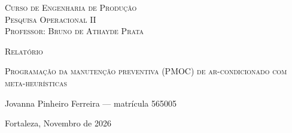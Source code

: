 \thispagestyle{empty}
\begin{titlingpage}



\begin{center}\large
    \textsc{Curso de Engenharia de Produção}\\
    \textsc{Pesquisa Operacional II }\\
    \textsc{Professor: Bruno de Athayde Prata}
    
    \vspace{4.5cm}
    
    {\LARGE \textsc{Relatório}}
    
    \vspace{1cm}
    
    {\LARGE \textsc{Programação da manutenção preventiva (PMOC) de ar-condicionado com meta-heurísticas}}
    
    \vspace{4cm}
    
    Jovanna Pinheiro Ferreira --- matrícula 565005\\

    
    \vfill

    \normalsize{Fortaleza, Novembro de 2026}

\end{center}

\end{titlingpage}

